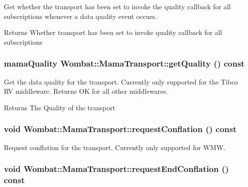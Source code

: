 Get whether the transport has been set to invoke the quality callback for all subscriptions whenever a data quality event occurs. \begin{DoxyReturn}{Returns}
Whether transport has been set to invoke quality callback for all subscriptions 
\end{DoxyReturn}
\hypertarget{classWombat_1_1MamaTransport_afe1b4fcbb84eff80122955bec5412eab}{
\subsubsection[{getQuality}]{\setlength{\rightskip}{0pt plus 5cm}mamaQuality Wombat::MamaTransport::getQuality () const}}
\label{classWombat_1_1MamaTransport_afe1b4fcbb84eff80122955bec5412eab}


Get the data quality for the transport. Currently only supported for the Tibco RV middleware. Returns OK for all other middlewares.

\begin{DoxyReturn}{Returns}
The Quality of the transport 
\end{DoxyReturn}
\hypertarget{classWombat_1_1MamaTransport_a0dbae24d48b2655bfba5b93b0b339f6d}{
\subsubsection[{requestConflation}]{\setlength{\rightskip}{0pt plus 5cm}void Wombat::MamaTransport::requestConflation () const}}
\label{classWombat_1_1MamaTransport_a0dbae24d48b2655bfba5b93b0b339f6d}


Request conflation for the transport. Currently only supported for WMW. \hypertarget{classWombat_1_1MamaTransport_a2151c9487ce75db6da223bd4b48662ae}{
\subsubsection[{requestEndConflation}]{\setlength{\rightskip}{0pt plus 5cm}void Wombat::MamaTransport::requestEndConflation () const}}
\label{classWombat_1_1MamaTransport_a2151c9487ce75db6da223bd4b48662ae}


